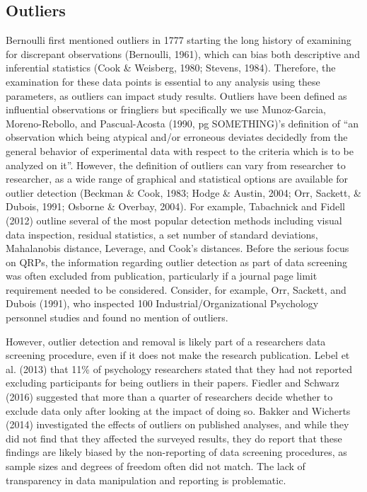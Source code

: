 \documentclass[english,man]{apa6}
\theoremstyle{definition}
\theoremstyle{definition}
\theoremstyle{definition}
\theoremstyle{remark}
\begin{document}
\subsection{Outliers}\label{outliers}

Bernoulli first mentioned outliers in 1777 starting the long history of
examining for discrepant observations (Bernoulli, 1961), which can bias
both descriptive and inferential statistics (Cook \& Weisberg, 1980;
Stevens, 1984). Therefore, the examination for these data points is
essential to any analysis using these parameters, as outliers can impact
study results. Outliers have been defined as influential observations or
fringliers but specifically we use Munoz-Garcia, Moreno-Rebollo, and
Pascual-Acosta (1990, pg SOMETHING)'s definition of \enquote{an
observation which being atypical and/or erroneous deviates decidedly
from the general behavior of experimental data with respect to the
criteria which is to be analyzed on it}. However, the definition of
outliers can vary from researcher to researcher, as a wide range of
graphical and statistical options are available for outlier detection
(Beckman \& Cook, 1983; Hodge \& Austin, 2004; Orr, Sackett, \& Dubois,
1991; Osborne \& Overbay, 2004). For example, Tabachnick and Fidell
(2012) outline several of the most popular detection methods including
visual data inspection, residual statistics, a set number of standard
deviations, Mahalanobis distance, Leverage, and Cook's distances. Before
the serious focus on QRPs, the information regarding outlier detection
as part of data screening was often excluded from publication,
particularly if a journal page limit requirement needed to be
considered. Consider, for example, Orr, Sackett, and Dubois (1991), who
inspected 100 Industrial/Organizational Psychology personnel studies and
found no mention of outliers.

However, outlier detection and removal is likely part of a researchers
data screening procedure, even if it does not make the research
publication. Lebel et al. (2013) that 11\% of psychology researchers
stated that they had not reported excluding participants for being
outliers in their papers. Fiedler and Schwarz (2016) suggested that more
than a quarter of researchers decide whether to exclude data only after
looking at the impact of doing so. Bakker and Wicherts (2014)
investigated the effects of outliers on published analyses, and while
they did not find that they affected the surveyed results, they do
report that these findings are likely biased by the non-reporting of
data screening procedures, as sample sizes and degrees of freedom often
did not match. The lack of transparency in data manipulation and
reporting is problematic.
\end{document}
